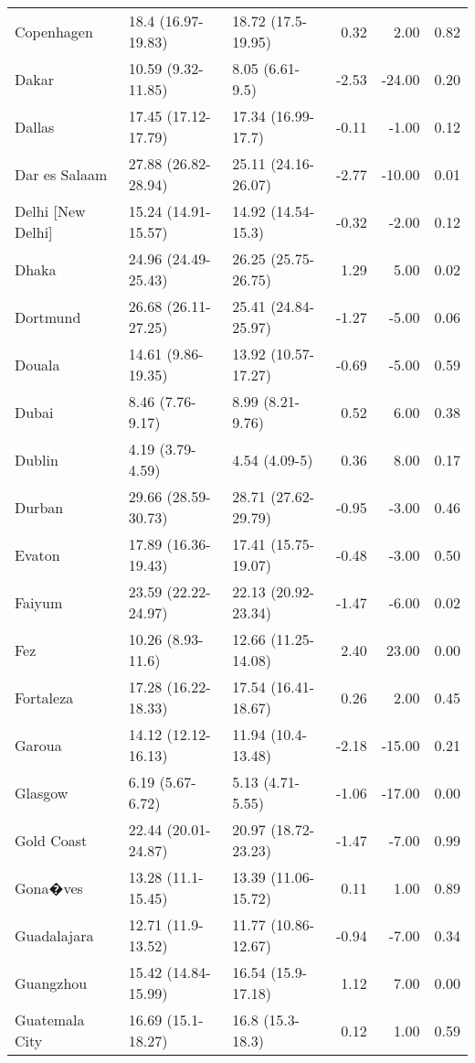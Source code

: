 \begin{longtable}{lllrrr}
  Copenhagen & 18.4
 (16.97-19.83) & 18.72
 (17.5-19.95) & 0.32 & 2.00 & 0.82 \\ 
  Dakar & 10.59
 (9.32-11.85) & 8.05
 (6.61-9.5) & -2.53 & -24.00 & 0.20 \\ 
  Dallas & 17.45
 (17.12-17.79) & 17.34
 (16.99-17.7) & -0.11 & -1.00 & 0.12 \\ 
  Dar es Salaam & 27.88
 (26.82-28.94) & 25.11
 (24.16-26.07) & -2.77 & -10.00 & 0.01 \\ 
  Delhi [New Delhi] & 15.24
 (14.91-15.57) & 14.92
 (14.54-15.3) & -0.32 & -2.00 & 0.12 \\ 
  Dhaka & 24.96
 (24.49-25.43) & 26.25
 (25.75-26.75) & 1.29 & 5.00 & 0.02 \\ 
  Dortmund & 26.68
 (26.11-27.25) & 25.41
 (24.84-25.97) & -1.27 & -5.00 & 0.06 \\ 
  Douala & 14.61
 (9.86-19.35) & 13.92
 (10.57-17.27) & -0.69 & -5.00 & 0.59 \\ 
  Dubai & 8.46
 (7.76-9.17) & 8.99
 (8.21-9.76) & 0.52 & 6.00 & 0.38 \\ 
  Dublin & 4.19
 (3.79-4.59) & 4.54
 (4.09-5) & 0.36 & 8.00 & 0.17 \\ 
  Durban & 29.66
 (28.59-30.73) & 28.71
 (27.62-29.79) & -0.95 & -3.00 & 0.46 \\ 
  Evaton & 17.89
 (16.36-19.43) & 17.41
 (15.75-19.07) & -0.48 & -3.00 & 0.50 \\ 
  Faiyum & 23.59
 (22.22-24.97) & 22.13
 (20.92-23.34) & -1.47 & -6.00 & 0.02 \\ 
  Fez & 10.26
 (8.93-11.6) & 12.66
 (11.25-14.08) & 2.40 & 23.00 & 0.00 \\ 
  Fortaleza & 17.28
 (16.22-18.33) & 17.54
 (16.41-18.67) & 0.26 & 2.00 & 0.45 \\ 
  Garoua & 14.12
 (12.12-16.13) & 11.94
 (10.4-13.48) & -2.18 & -15.00 & 0.21 \\ 
  Glasgow & 6.19
 (5.67-6.72) & 5.13
 (4.71-5.55) & -1.06 & -17.00 & 0.00 \\ 
  Gold Coast & 22.44
 (20.01-24.87) & 20.97
 (18.72-23.23) & -1.47 & -7.00 & 0.99 \\ 
  Gona�ves & 13.28
 (11.1-15.45) & 13.39
 (11.06-15.72) & 0.11 & 1.00 & 0.89 \\ 
  Guadalajara & 12.71
 (11.9-13.52) & 11.77
 (10.86-12.67) & -0.94 & -7.00 & 0.34 \\ 
  Guangzhou & 15.42
 (14.84-15.99) & 16.54
 (15.9-17.18) & 1.12 & 7.00 & 0.00 \\ 
  Guatemala City & 16.69
 (15.1-18.27) & 16.8
 (15.3-18.3) & 0.12 & 1.00 & 0.59 \\ 

\end{longtable}
